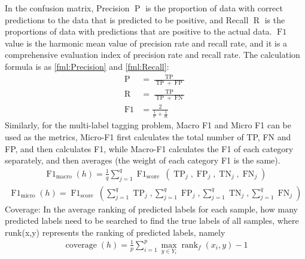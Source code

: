 
In the confusion matrix, Precision \(\operatorname{P}\) is the proportion of data with correct predictions to the data that is predicted to be positive, and Recall \(\operatorname{R}\) is the proportions of data with predictions that are positive to the actual data. \(\operatorname{F1}\) value is the harmonic mean value of precision rate and recall rate, and it is a comprehensive evaluation index of precision rate and recall rate. The calculation formula is as \ref{fml:Precision} and \ref{fml:Recall}:
\begin{align}
	\operatorname{P}  & =\frac{\operatorname{TP}}{\operatorname{TP}+\operatorname{FP}} \label{fml:Precision} \\
	\operatorname{R}  & =\frac{\operatorname{TP}}{\operatorname{TP}+\operatorname{FN}} \label{fml:Recall}    \\
	\operatorname{F1} & = \frac{2}{\frac{1}{\operatorname{P}}+\frac{1}{\operatorname{R}}}
\end{align}
Similarly, for the multi-label tagging problem, Macro F1 and Micro F1 can be used as the metrics, Micro-F1 first calculates the total number of TP, FN and FP, and then calculates F1, while Macro-F1 calculates the F1 of each category separately, and then averages (the weight of each category F1 is the same).
\begin{align}
	\operatorname{F1}_{\text {macro}}(h)=\frac{1}{q} \sum_{j=1}^{q} \operatorname{F1}_{\text {score }}\left(\operatorname{TP}_{j}, \operatorname{FP}_{j}, \operatorname{TN}_{j}, \operatorname{FN}_{j}\right)
\end{align}
\begin{align}
	\operatorname{F1}_{\text {micro}}(h)=\operatorname{F1}_{\text {score }}\left(\sum_{j=1}^{q} \operatorname{TP}_{j}, \sum_{j=1}^{q} \operatorname{FP}_{j}, \sum_{j=1}^{q} \operatorname{TN}_{j}, \sum_{j=1}^{q} \operatorname{FN}_{j}\right)
\end{align}
Coverage: In the average ranking of predicted labels for each sample, how many predicted labels need to be searched to find the true labels of all samples, where runk(x,y) represents the ranking of predicted labels, namely
\begin{align}
	\operatorname{coverage}(h)=\frac{1}{p} \sum_{i=1}^{p} \max _{y \in Y_{i}} \operatorname{rank}_{f}\left(x_{i}, y\right)-1
\end{align}
